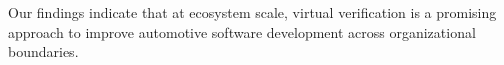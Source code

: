 Our findings indicate that at ecosystem scale, virtual verification is a promising approach to improve automotive software development across organizational boundaries.






